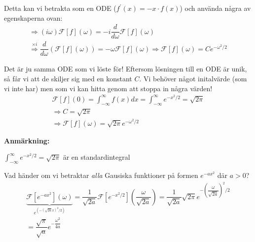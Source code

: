 \noindent Detta kan vi betrakta som en ODE ($f^{\prime}(x) = -x\cdot f(x)$) och använda några av egenskaperna ovan: 
\begin{equation*}
  \begin{gathered}
    \Rightarrow (i\omega)\mathcal{F}[f](\omega) = -i\dfrac{d}{d\omega}\mathcal{F}[f](\omega)\\
    \stackrel{\times i}{\Rightarrow}\dfrac{d}{d\omega}\left(\mathcal{F}[f](\omega)\right) = -\omega\mathcal{F}[f](\omega)\Rightarrow \mathcal{F}[f](\omega) = Ce^{-\omega^2/2}
  \end{gathered}
\end{equation*}
\par\bigskip
\noindent Det är ju samma ODE som vi löste för! Eftersom lösningen till en ODE är unik, så får vi att de skiljer sig med en konstant $C$. Vi behöver något initalvärde (som vi inte har) men som vi kan hitta genom att stoppa in några värden!
\begin{equation*}
  \begin{gathered}
    \mathcal{F}[f](0) = \int_{-\infty}^{\infty}f(x)dx = \int_{-\infty}^{\infty}e^{-x^2/2} = \sqrt{2\pi}\\
    \Rightarrow C = \sqrt{2\pi}\\
    \Rightarrow \mathcal{F}[f](\omega) = \sqrt{2\pi}e^{-\omega^2/2}
  \end{gathered}
\end{equation*}
\par\bigskip
\noindent\textbf{Anmärkning:}\par
\noindent $\int_{-\infty}^{\infty}e^{-x^2/2} = \sqrt{2\pi}$ är en standardintegral
\par\bigskip
\noindent Vad händer om vi betraktar \textit{alla} Gausiska funktioner på formen $e^{-ax^2}$ där $a>0$?
\begin{equation*}
  \begin{gathered}
    \underbrace{\mathcal{F}[e^{-ax^2}](\omega)}_{\text{$e^{(-(\sqrt{2a}x)^2/2)}$}} = \dfrac{1}{\sqrt{2a}}\mathcal{F}[e^{-x^2/2}]\left(\dfrac{\omega}{\sqrt{2a}}\right) = \dfrac{1}{\sqrt{2a}}\sqrt{2\pi}e^{-\left(\dfrac{\omega}{\sqrt{2a}}\right)^2/2}\\
    = \dfrac{\sqrt{\pi}}{\sqrt{a}}e^{-\dfrac{\omega^2}{4a}}
  \end{gathered}
\end{equation*}
\par\bigskip
